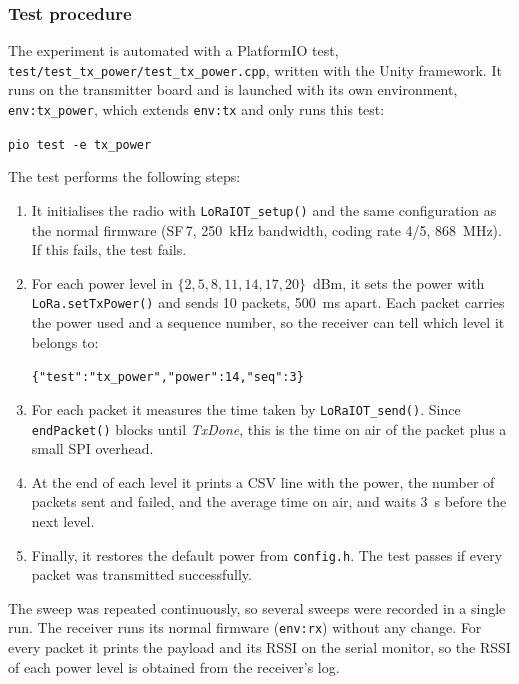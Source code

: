 \documentclass[informe,english]{plantilla}
\begin{document}
\subsubsection{Test procedure}

The experiment is automated with a PlatformIO test,
\texttt{test/test\_tx\_power/test\_tx\_power.cpp}, written with the Unity
framework. It runs on the transmitter board and is launched with its own
environment, \texttt{env:tx\_power}, which extends \texttt{env:tx} and only
runs this test:
\begin{center}
    \texttt{pio test -e tx\_power}
\end{center}

The test performs the following steps:
\begin{enumerate}
    \item It initialises the radio with \texttt{LoRaIOT\_setup()} and the same
          configuration as the normal firmware
          (SF\,7, 250~kHz bandwidth, coding rate 4/5, 868~MHz). If this fails, the test fails.
    \item For each power level in $\{2, 5, 8, 11, 14, 17, 20\}$~dBm, it sets
          the power with \texttt{LoRa.setTxPower()} and sends 10 packets,
          500~ms apart. Each packet carries the power used and a sequence
          number, so the receiver can tell which level it belongs to:
          \begin{center}
              \texttt{\{"test":"tx\_power","power":14,"seq":3\}}
          \end{center}
    \item For each packet it measures the time taken by
          \texttt{LoRaIOT\_send()}. Since \texttt{endPacket()} blocks until
          \emph{TxDone}, this is the time on air of the packet plus a small
          SPI overhead.
    \item At the end of each level it prints a CSV line with the power, the
          number of packets sent and failed, and the average time on air, and
          waits 3~s before the next level.
    \item Finally, it restores the default power from \texttt{config.h}. The
          test passes if every packet was transmitted successfully.
\end{enumerate}

The sweep was repeated continuously, so several sweeps were recorded in a
single run. The receiver runs its normal firmware (\texttt{env:rx}) without
any change. For every packet it prints the payload and its RSSI on the serial
monitor, so the RSSI of each power level is obtained from the receiver's log.
\end{document}
